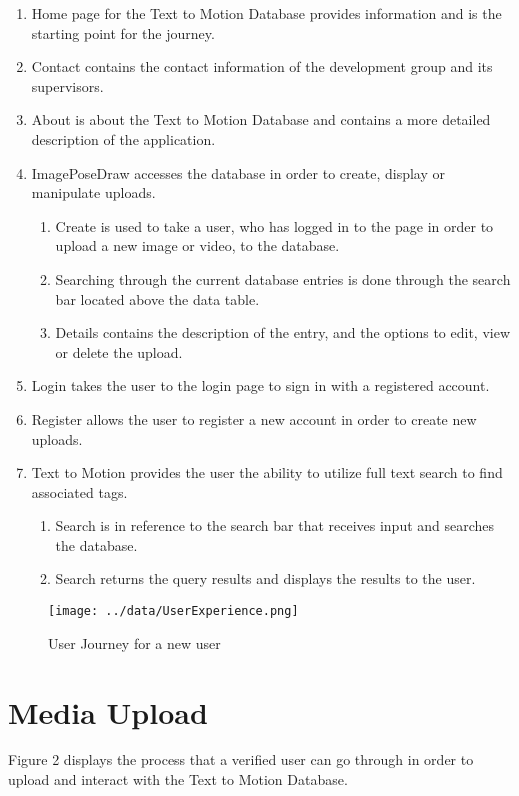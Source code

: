 \documentclass{scrreprt}
\begin{document}
\begin{enumerate}
  \item Home page for the Text to Motion Database provides information and is the starting point for the journey.
  \item Contact contains the contact information of the development group and its supervisors.
  \item About is about the Text to Motion Database and contains a more detailed description of the application.
  \item ImagePoseDraw accesses the database in order to create, display or manipulate uploads.
  \begin{enumerate}
    \item Create is used to take a user, who has logged in to the page in order to upload a new image or video, to the database.
    \item Searching through the current database entries is done through the search bar located above the data table.
    \item Details contains the description of the entry, and the options to edit, view or delete the upload.
  \end{enumerate}
  \item Login takes the user to the login page to sign in with a registered account.
  \item Register allows the user to register a new account in order to create new uploads.
  \item Text to Motion provides the user the ability to utilize full text search to find associated tags.
  \begin{enumerate}
    \item Search is in reference to the search bar that receives input and searches the database.
    \item Search returns the query results and displays the results to the user.
  \end{enumerate}
\end{enumerate}

\begin{figure}[!ht]
        \caption{User Journey for a new user}
        \label{erDiagram}
        \centering
        \texttt{[image: ../data/UserExperience.png]}
\end{figure}

\section{Media Upload}
Figure 2 displays the process that a verified user can go through in order to upload and interact with the Text to Motion Database.
\end{document}
